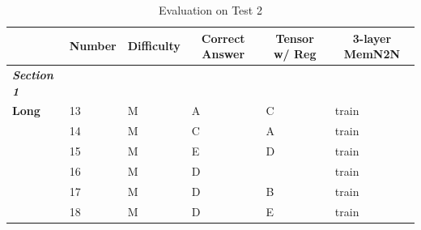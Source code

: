 \documentclass[pageno]{final_paper}
\newcommand{\textbi}[1]{\textbf{\textit{#1}}}
\begin{document}
\begin{table}[]
\footnotesize
\centering
\caption{Evaluation on Test 2}
\label{tab: Evaluation on Test 2}
\begin{tabular}{llllll}
\toprule
\multicolumn{1}{c}{}     & \multicolumn{1}{c}{\textbf{Number}} & \multicolumn{1}{c}{\textbf{Difficulty}} & \multicolumn{1}{c}{\textbf{Correct Answer}} & \multicolumn{1}{c}{\textbf{Tensor w/ Reg}} & \multicolumn{1}{c}{\textbf{3-layer MemN2N}} \\ \midrule
\textbi{Section 1}       &                                     &                                         &                                             &                                            &                                             \\ \midrule
\textbf{Long}            & 13                                  & M                                       & A                                           & C                                          & train                                       \\
\textbf{}                & 14                                  & M                                       & C                                           & A                                          & train                                       \\
\textbf{}                & 15                                  & M                                       & E                                           & D                                          & train                                       \\
\textbf{}                & 16                                  & M                                       & D                                           & \g{D}                                      & train                                       \\
\textbf{}                & 17                                  & M                                       & D                                           & B                                          & train                                       \\
\textbf{}                & 18                                  & M                                       & D                                           & E                                          & train                                       \\

\end{tabular}
\end{table}
\end{document}
